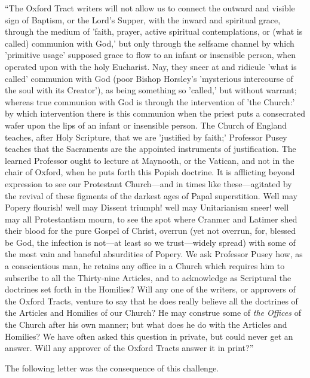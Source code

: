 ``The Oxford Tract writers will not allow us to
connect the outward and visible sign of Baptism, or the Lord's Supper,
with the inward and spiritual grace, through the medium of 'faith,
prayer, active spiritual contemplations, or (what is called) communion
with God,' but only through the selfsame channel by which 'primitive
usage' supposed grace to flow to an infant or insensible person, when
operated upon with the holy Eucharist. Nay, they sneer at and ridicule
'what is called' communion with God (poor Bishop Horsley's 'mysterious
intercourse of the soul with its Creator'), as being something
so 'called,' but without warrant; whereas true communion with God is
through the intervention of 'the Church:' by which intervention there
is this communion when the priest puts a consecrated wafer upon the
lips of an infant or insensible person. The Church of England teaches,
after Holy Scripture, that we are 'justified by faith;' Professor
Pusey teaches that the Sacraments are the appointed instruments of
justification. The learned Professor ought to lecture at Maynooth, or
the Vatican, and not in the chair of Oxford, when he puts forth this
Popish doctrine. It is afflicting beyond expression to see our
Protestant Church—and in times like these—agitated by the revival
of these figments of the darkest ages of Papal superstition. Well may
Popery flourish! well may Dissent triumph! well may Unitarianism
sneer! well may all Protestantism mourn, to see the spot where Cranmer
and Latimer shed their blood for the pure Gospel of Christ, overrun
(yet not overrun, for, blessed be God, the infection is not—at least
so we trust—widely spread) with some of the most vain and baneful
absurdities of Popery. We ask Professor Pusey how, as a conscientious
man, he retains any office in a Church which requires him to subscribe
to all the Thirty-nine Articles, and to acknowledge as Scriptural the
doctrines set forth in the Homilies? Will any one of the
writers, or approvers of the Oxford Tracts, venture to say that he
does really believe all the doctrines of the Articles and Homilies of
our Church? He may construe some of \emph{the Offices} of the Church
after his own manner; but what does he do with the Articles and
Homilies? We have often asked this question in private, but could
never get an answer. Will any approver of the Oxford Tracts answer it
in print?''

The following letter was the consequence of this
challenge.


